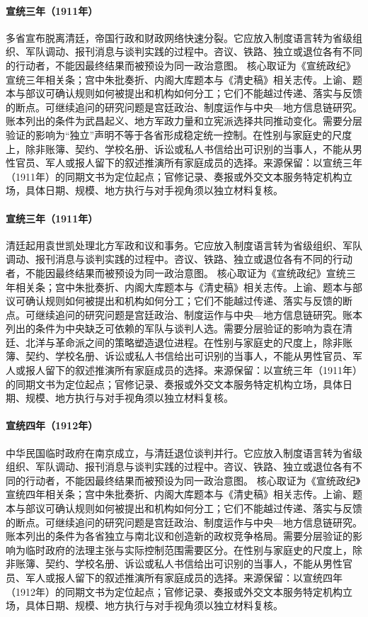 \hypertarget{public:EQ-1911-PROVINCIAL-INDEPENDENCE}{}\paragraph{宣统三年（1911年）}多省宣布脱离清廷，帝国行政和财政网络快速分裂。它应放入制度语言转为省级组织、军队调动、报刊消息与谈判实践的过程中。咨议、铁路、独立或退位各有不同的行动者，不能因最终结果而被预设为同一政治意图。 核心取证为《宣统政纪》宣统三年相关条；宫中朱批奏折、内阁大库题本与《清史稿》相关志传。上谕、题本与部议可确认规则如何被提出和机构如何分工；它们不能越过传递、落实与反馈的断点。可继续追问的研究问题是宫廷政治、制度运作与中央—地方信息链研究。账本列出的条件为武昌起义、地方军政力量和立宪派选择共同推动变化。需要分层验证的影响为“独立”声明不等于各省形成稳定统一控制。在性别与家庭史的尺度上，除非账簿、契约、学校名册、诉讼或私人书信给出可识别的当事人，不能从男性官员、军人或报人留下的叙述推演所有家庭成员的选择。来源保留：以宣统三年（1911年）的同期文书为定位起点；官修记录、奏报或外交文本服务特定机构立场，具体日期、规模、地方执行与对手视角须以独立材料复核。
\hypertarget{public:EQ-1911-YUAN-SHIKAI-RETURN}{}\paragraph{宣统三年（1911年）}清廷起用袁世凯处理北方军政和议和事务。它应放入制度语言转为省级组织、军队调动、报刊消息与谈判实践的过程中。咨议、铁路、独立或退位各有不同的行动者，不能因最终结果而被预设为同一政治意图。 核心取证为《宣统政纪》宣统三年相关条；宫中朱批奏折、内阁大库题本与《清史稿》相关志传。上谕、题本与部议可确认规则如何被提出和机构如何分工；它们不能越过传递、落实与反馈的断点。可继续追问的研究问题是宫廷政治、制度运作与中央—地方信息链研究。账本列出的条件为中央缺乏可依赖的军队与谈判人选。需要分层验证的影响为袁在清廷、北洋与革命派之间的策略塑造退位进程。在性别与家庭史的尺度上，除非账簿、契约、学校名册、诉讼或私人书信给出可识别的当事人，不能从男性官员、军人或报人留下的叙述推演所有家庭成员的选择。来源保留：以宣统三年（1911年）的同期文书为定位起点；官修记录、奏报或外交文本服务特定机构立场，具体日期、规模、地方执行与对手视角须以独立材料复核。
\hypertarget{public:EQ-1912-REPUBLIC-FOUNDING}{}\paragraph{宣统四年（1912年）}中华民国临时政府在南京成立，与清廷退位谈判并行。它应放入制度语言转为省级组织、军队调动、报刊消息与谈判实践的过程中。咨议、铁路、独立或退位各有不同的行动者，不能因最终结果而被预设为同一政治意图。 核心取证为《宣统政纪》宣统四年相关条；宫中朱批奏折、内阁大库题本与《清史稿》相关志传。上谕、题本与部议可确认规则如何被提出和机构如何分工；它们不能越过传递、落实与反馈的断点。可继续追问的研究问题是宫廷政治、制度运作与中央—地方信息链研究。账本列出的条件为各省独立与南北议和创造新的政权竞争格局。需要分层验证的影响为临时政府的法理主张与实际控制范围需要区分。在性别与家庭史的尺度上，除非账簿、契约、学校名册、诉讼或私人书信给出可识别的当事人，不能从男性官员、军人或报人留下的叙述推演所有家庭成员的选择。来源保留：以宣统四年（1912年）的同期文书为定位起点；官修记录、奏报或外交文本服务特定机构立场，具体日期、规模、地方执行与对手视角须以独立材料复核。
